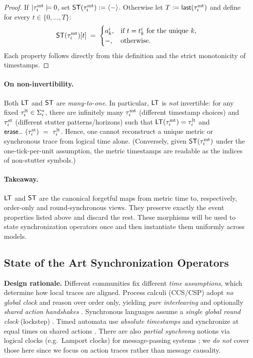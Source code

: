 \documentclass{article}
\begin{document}
  \begin{proof}
  \;
  If \(|\tau^{\mathrm{mt}}_i|=0\), set \(\mathsf{ST}(\tau^{\mathrm{mt}}_i):=\langle - \rangle \).
  Otherwise let \(T:=\mathsf{last}(\tau^{\mathrm{mt}}_i)\) and define for every \(t\in\{0,\dots,T\}\):
  \[
  \mathsf{ST}(\tau^{\mathrm{mt}}_i)[t]\;=\;
  \begin{cases}
  a^i_k, & \text{if } t=t^i_k \text{ for the unique }k,\\
  -, & \text{otherwise.}
  \end{cases}
  \]
  Each property follows directly from this definition and the strict monotonicity of timestamps.
  \end{proof}
  
  \paragraph{On non-invertibility.}
  Both \(\mathsf{LT}\) and \(\mathsf{ST}\) are \emph{many-to-one}. In particular, \(\mathsf{LT}\) is \emph{not} invertible:
  for any fixed \(\tau^{\mathrm{lt}}_i\in\Sigma_i^{*}\), there are infinitely many \(\tau^{\mathrm{mt}}_i\) (different timestamp choices) and \(\tau^{\mathrm{st}}_i\) (different stutter patterns/horizons) such that
  \(\mathsf{LT}(\tau^{\mathrm{mt}}_i)=\tau^{\mathrm{lt}}_i\) and \\\(\mathsf{erase}_{-}~(\tau^{\mathrm{st}}_i)~=~\tau^{\mathrm{lt}}_i\).
  Hence, one cannot reconstruct a unique metric or synchronous trace from logical time alone.
  (Conversely, given \(\mathsf{ST}(\tau^{\mathrm{mt}}_i)\) under the one-tick-per-unit assumption, the metric timestamps are readable as the indices of non-stutter symbols.)
  
  \paragraph{Takeaway.}
  \(\mathsf{LT}\) and \(\mathsf{ST}\) are the canonical forgetful maps from metric time to, respectively, order-only and round-synchronous views.
  They preserve exactly the event properties listed above and discard the rest.
  These morphisms will be used to state synchronization operators once and then instantiate them uniformly across models.
  \subsection{State of the Art Synchronization Operators}\label{operators}
  
  \noindent\textbf{Design rationale.}
  Different communities fix different \emph{time assumptions}, which determine how local traces are aligned.
  Process calculi (CCS/CSP) adopt \emph{no global clock} and reason over order only, yielding \emph{pure interleaving} and optionally \emph{shared action handshakes} \cite{Milner89,Hoare85}.
  Synchronous languages assume a \emph{single global round clock} (lockstep) \cite{Halbwachs93}.
  Timed automata use \emph{absolute timestamps} and synchronize at equal times on shared actions \cite{AlurDill94}.
  There are also \emph{partial synchrony} notions via logical clocks (e.g.\ Lamport clocks) for message-passing systems \cite{Lamport78}; we \emph{do not} cover those here since we focus on action traces rather than message causality.
  
\end{document}
